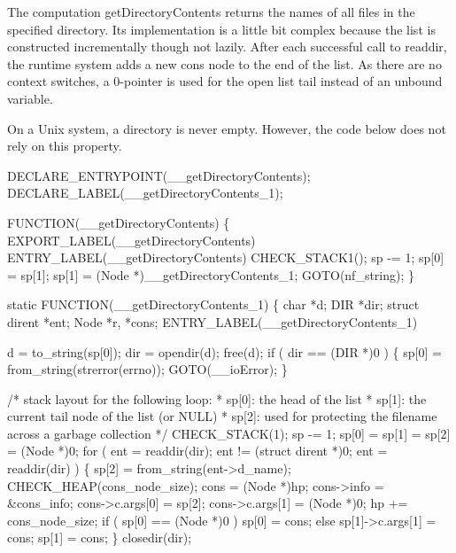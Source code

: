 \nwendcode{}\nwdocspar
The computation {\Tt{}getDirectoryContents\nwendquote} returns the names of all
files in the specified directory. Its implementation is a little bit
complex because the list is constructed incrementally though not
lazily. After each successful call to {\Tt{}readdir\nwendquote}, the runtime system
adds a new cons node to the end of the list. As there are no context
switches, a 0-pointer is used for the open list tail instead of an
unbound variable.

On a Unix system, a directory is never empty. However, the code below
does not rely on this property.

\nwenddocs{}\plusendmoddef\nwstartdeflinemarkup{}\nwenddeflinemarkup
DECLARE_ENTRYPOINT(__getDirectoryContents);
DECLARE_LABEL(__getDirectoryContents_1);

FUNCTION(__getDirectoryContents)
\{
    EXPORT_LABEL(__getDirectoryContents)
 ENTRY_LABEL(__getDirectoryContents)
    CHECK_STACK1();
    sp   -= 1;
    sp[0] = sp[1];
    sp[1] = (Node *)__getDirectoryContents_1;
    GOTO(nf_string);
\}

static
FUNCTION(__getDirectoryContents_1)
\{
    char          *d;
    DIR           *dir;
    struct dirent *ent; 
    Node          *r, *cons;
 ENTRY_LABEL(__getDirectoryContents_1)

    d   = to_string(sp[0]);
    dir = opendir(d);
    free(d);
    if ( dir == (DIR *)0 )
    \{
        sp[0] = from_string(strerror(errno));
        GOTO(__ioError);
    \}

    /* stack layout for the following loop:
     * sp[0]: the head of the list
     * sp[1]: the current tail node of the list (or NULL)
     * sp[2]: used for protecting the filename across a garbage collection
     */
    CHECK_STACK(1);
    sp   -= 1;
    sp[0] = sp[1] = sp[2] = (Node *)0;
    for ( ent = readdir(dir); ent != (struct dirent *)0; ent = readdir(dir) )
    \{
        sp[2]           = from_string(ent->d_name);
        CHECK_HEAP(cons_node_size);
        cons            = (Node *)hp;
        cons->info      = &cons_info;
        cons->c.args[0] = sp[2];
        cons->c.args[1] = (Node *)0;
        hp             += cons_node_size;
        if ( sp[0] == (Node *)0 )
            sp[0] = cons;
        else
            sp[1]->c.args[1] = cons;
        sp[1] = cons;
    \}
    closedir(dir);

